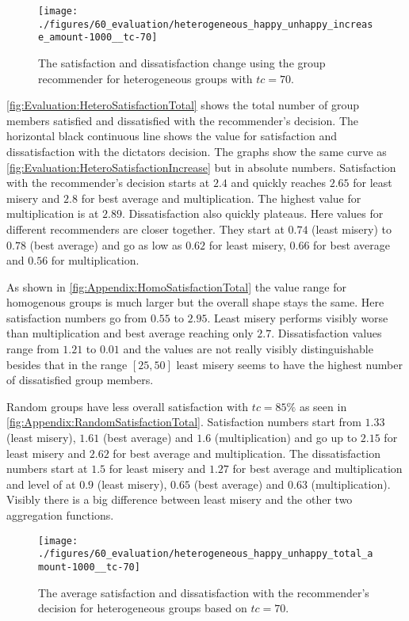 \begin{figure}
    \centering
    \texttt{[image: ./figures/60\_evaluation/heterogeneous\_happy\_unhappy\_increase\_amount-1000\_\_tc-70]}
    \caption{The satisfaction and dissatisfaction change using the group recommender for heterogeneous groups with $tc = 70$.}
    \label{fig:Evaluation:HeteroSatisfactionIncrease}
\end{figure}

\autoref{fig:Evaluation:HeteroSatisfactionTotal} shows the total number of group members satisfied and dissatisfied with the recommender's decision. The horizontal black continuous line shows the value for satisfaction and dissatisfaction with the dictators decision. The graphs show the same curve as \autoref{fig:Evaluation:HeteroSatisfactionIncrease} but in absolute numbers. Satisfaction with the recommender's decision starts at $2.4$ and quickly reaches $2.65$ for least misery and $2.8$ for best average and multiplication. The highest value for multiplication is at $2.89$. Dissatisfaction also  quickly plateaus. Here values for different recommenders are closer together. They start at $0.74$ (least misery) to $0.78$ (best average) and go as low as $0.62$ for least misery, $0.66$ for best average and $0.56$ for multiplication.

As shown in \autoref{fig:Appendix:HomoSatisfactionTotal} the value range for homogenous groups is much larger but the overall shape stays the same. Here satisfaction numbers go from $0.55$ to $2.95$. Least misery performs visibly worse than multiplication and best average reaching only $2.7$. Dissatisfaction values range from $1.21$ to $0.01$ and the values are not really visibly distinguishable besides that in the range $[25,50]$ least misery seems to have the highest number of dissatisfied group members.

Random groups have less overall satisfaction with $tc = 85\%$ as seen in \autoref{fig:Appendix:RandomSatisfactionTotal}. Satisfaction numbers start from $1.33$ (least misery), $1.61$ (best average) and $1.6$ (multiplication) and go up to $2.15$ for least misery and $2.62$ for best average and multiplication. The dissatisfaction numbers start at $1.5$ for least misery and $1.27$ for best average and multiplication and level of at $0.9$ (least misery), $0.65$ (best average) and $0.63$ (multiplication). Visibly there is a big difference between least misery and the other two aggregation functions.

\begin{figure}
    \centering
    \texttt{[image: ./figures/60\_evaluation/heterogeneous\_happy\_unhappy\_total\_amount-1000\_\_tc-70]}
    \caption{The average satisfaction and dissatisfaction with the recommender's decision for heterogeneous groups based on $tc = 70$.}
    \label{fig:Evaluation:HeteroSatisfactionTotal}
\end{figure}

